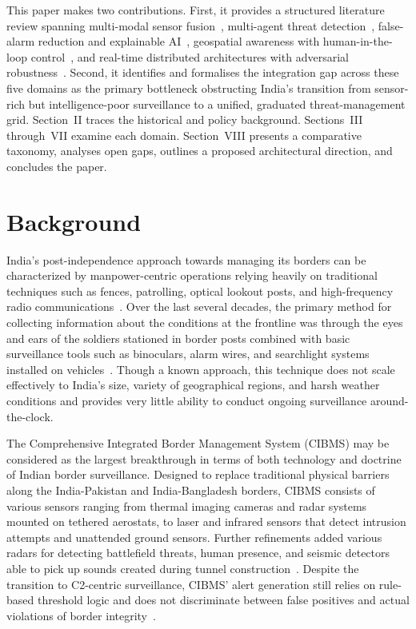 This paper makes two contributions. First, it provides a structured literature review spanning multi-modal sensor fusion~\cite{meng2023multisource}, multi-agent threat detection~\cite{hassan2025multiagent, agenticcyber2025}, false-alarm reduction and explainable AI~\cite{zhang2022xai, deepsurvey2023anomaly}, geospatial awareness with human-in-the-loop control~\cite{karimipour2021iot, hitl2023trust}, and real-time distributed architectures with adversarial robustness~\cite{flink2024kafka, advyolo2022}. Second, it identifies and formalises the integration gap across these five domains as the primary bottleneck obstructing India's transition from sensor-rich but intelligence-poor surveillance to a unified, graduated threat-management grid. Section~II traces the historical and policy background. Sections~III through~VII examine each domain. Section~VIII presents a comparative taxonomy, analyses open gaps, outlines a proposed architectural direction, and concludes the paper.



\section{Background}
\label{sec:background}

India's post-independence approach towards managing its borders can be characterized by manpower-centric operations relying heavily on traditional techniques such as fences, patrolling, optical lookout posts, and high-frequency radio communications~\cite{indiaai2024springer}. Over the last several decades, the primary method for collecting information about the conditions at the frontline was through the eyes and ears of the soldiers stationed in border posts combined with basic surveillance tools such as binoculars, alarm wires, and searchlight systems installed on vehicles~\cite{indiaai2024springer}. Though a known approach, this technique does not scale effectively to India's size, variety of geographical regions, and harsh weather conditions and provides very little ability to conduct ongoing surveillance around-the-clock.

The Comprehensive Integrated Border Management System (CIBMS) may be considered as the largest breakthrough in terms of both technology and doctrine of Indian border surveillance. Designed to replace traditional physical barriers along the India-Pakistan and India-Bangladesh borders, CIBMS consists of various sensors ranging from thermal imaging cameras and radar systems mounted on tethered aerostats, to laser and infrared sensors that detect intrusion attempts and unattended ground sensors. Further refinements added various radars for detecting battlefield threats, human presence, and seismic detectors able to pick up sounds created during tunnel construction~\cite{indiaai2024springer}. Despite the transition to C2-centric surveillance, CIBMS' alert generation still relies on rule-based threshold logic and does not discriminate between false positives and actual violations of border integrity~\cite{cctv2024anomaly}.


